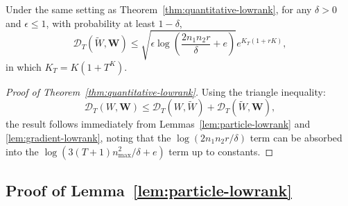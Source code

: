 \begin{lemma}
\label{lem:gradient-lowrank}
Under the same setting as Theorem~\ref{thm:quantitative-lowrank}, for any $\delta > 0$ and $\epsilon \le 1$, with probability at least $1-\delta$,
\[
\mathscr{D}_T(\tilde{W}, \mathbf{W}) \le \sqrt{\epsilon\log\left(\frac{2n_1n_2r}{\delta} + e\right)}e^{K_T(1+rK)},
\]
in which $K_T = K(1+T^K)$.
\end{lemma}

\begin{proof}[Proof of Theorem~\ref{thm:quantitative-lowrank}]
Using the triangle inequality:
\[
\mathscr{D}_T(W, \mathbf{W}) \le \mathscr{D}_T(W, \tilde{W}) + \mathscr{D}_T(\tilde{W}, \mathbf{W}),
\]
the result follows immediately from Lemmas~\ref{lem:particle-lowrank} and \ref{lem:gradient-lowrank}, noting that the $\log(2n_1n_2r/\delta)$ term can be absorbed into the $\log(3(T+1)n_{\max}^2/\delta + e)$ term up to constants.
\end{proof}

\subsection{Proof of Lemma~\ref{lem:particle-lowrank}}

